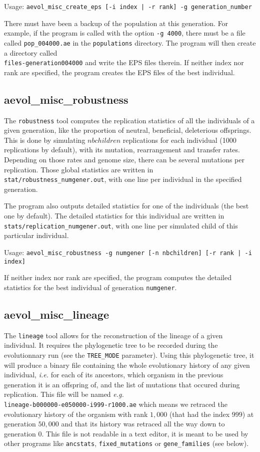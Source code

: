 Usage: \verb?aevol_misc_create_eps [-i index | -r rank] -g generation_number?

There must have been a backup of the population at this generation. For example, if the program is called with the option
\verb?-g 4000?, there must be a file called \verb?pop_004000.ae? in the \verb?populations? directory. The program will then create a directory called \\\verb?files-generation004000? and write the EPS files therein. If neither index nor rank are specified, the program creates the EPS files of the best individual.

\subsection{aevol\_misc\_robustness}
\label{sect:robustness}

The \verb?robustness? tool computes the replication statistics of all the individuals of a given generation, like the proportion of neutral, beneficial, deleterious offsprings. This is done by simulating $nbchildren$ replications for each individual (1000 replications by default), with its mutation, rearrangement and transfer rates. Depending on those rates and genome size, there can be several mutations per replication. Those global statistics are written in \verb?stat/robustness_numgener.out?, with one line per individual in the specified generation.

The program also outputs detailed statistics for one of the individuals (the best one by default). The detailed statistics for this individual are written in \verb?stats/replication_numgener.out?, with one line per simulated child of this particular individual.

Usage: \verb?aevol_misc_robustness -g numgener [-n nbchildren] [-r rank | -i index]?

If neither index nor rank are specified, the program computes the detailed statistics for the best individual of generation \verb?numgener?.


\subsection{aevol\_misc\_lineage}
\label{sect:lineage}
The \verb?lineage? tool allows for the reconstruction of the lineage of a given individual. It requires the phylogenetic tree to be recorded during the evolutionnary run (see the \verb?TREE_MODE? parameter). Using this phylogenetic tree, it will produce a binary file containing the whole evolutionary history of any given individual, \emph{i.e.} for each of its ancestors, which organism in the previous generation it is an offspring of, and the list of mutations that occured during replication. This file will be named \emph{e.g.} \\\verb?lineage-b000000-e050000-i999-r1000.ae? which means we retraced the evolutionary history of the organism with rank $1,000$ (that had the index $999$) at generation $50,000$ and that its history was retraced all the way down to generation $0$. This file is not readable in a text editor, it is meant to be used by other programs like \verb?ancstats?, \verb?fixed_mutations? or \verb?gene_families? (see below).

